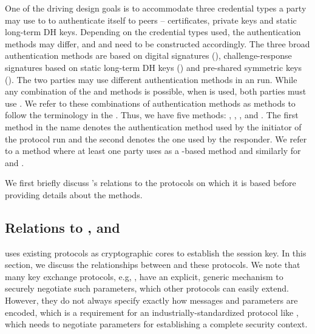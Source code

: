 One of the driving design goals is to accommodate three credential types
a party may use to to authenticate itself to peers -- certificates, private keys
and static long-term DH keys. Depending on the credential types used, the authentication methods may differ, and \mAuthi{} and \mAuthr{} need to be constructed accordingly.
%
%
The three broad authentication methods are based on digital signatures (\mSig), challenge-response signatures based on static long-term DH keys (\mStat) and pre-shared symmetric keys (\mPsk). The two parties may use different authentication methods in an \mEdhoc{} run.
%
While any combination of the \mSig{} and \mStat{} methods is possible, when \mPsk{} is used, both parties must use \mPsk{}.
%
We refer to these combinations of authentication methods as methods to follow the terminology in the \mSpec{}.
%
Thus, we have five methods: \mSigSig, \mSigStat, \mStatStat, \mStatSig{} and \mPskPsk.
%
The first method in the name denotes the authentication method used by the initiator of the protocol run and the second denotes the one used by the responder.
%
%
We refer to a method where at least one party uses \mSig{} as a \mSig-based method and similarly for \mStat{} and \mPsk.
%

We first briefly discuss \mEdhoc's relations to the protocols on which it is based before providing details about the methods.
%

\spacehack
\subsection{Relations to \mSigma, \mOptls{} and \mNoise{}}
\label{sec:relationsToOtherProtocols}
\fillhack
\mEdhoc{} uses existing protocols as cryptographic cores to
establish the session key. In this section, we discuss the relationships between \mEdhoc{} and these protocols.
%
%
%
We note that many key exchange protocols, e.g, \mSigma{}, have an explicit, generic mechanism to securely negotiate such parameters, which other protocols can easily extend. However, they do not always specify exactly how messages and parameters are encoded, which is a requirement for an industrially-standardized protocol like \mEdhoc{}, which needs to negotiate parameters for establishing a complete \mOscore{} security context.
%
%

